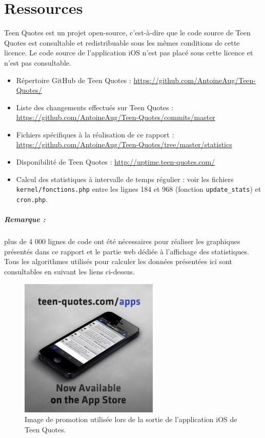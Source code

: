 \documentclass{report}
\begin{document}
	\chapter{Ressources}
	\label{chap:ressources}
	Teen Quotes est un projet open-source, c'est-à-dire que le code source de Teen Quotes est consultable et redistribuable sous les mêmes conditions de cette licence. Le code source de l'application iOS n'est pas placé sous cette licence et n'est pas consultable.\\

	\begin{itemize}
		\item Répertoire GitHub de Teen Quotes : \url{https://github.com/AntoineAug/Teen-Quotes/}
		\item Liste des changements effectués sur Teen Quotes : \url{https://github.com/AntoineAug/Teen-Quotes/commits/master}
		\item Fichiers spécifiques à la réalisation de ce rapport : \url{https://github.com/AntoineAug/Teen-Quotes/tree/master/statistics}
		\item Disponibilité de Teen Quotes : \url{http://uptime.teen-quotes.com/}
		\item Calcul des statistiques à intervalle de temps régulier : voir les fichiers \texttt{kernel/fonctions.php} entre les lignes 184 et 968 (fonction \texttt{update\_stats}) et \texttt{cron.php}.
	\end{itemize}

	\paragraph{Remarque :} plus de 4 000 lignes de code ont été nécessaires pour réaliser les graphiques présentés dans ce rapport et le partie web dédiée à l'affichage des statistiques. Tous les algorithmes utilisés pour calculer les données présentées ici sont consultables en suivant les liens ci-dessus.

	\begin{figure}[H]
		\center
		\includegraphics[width=250px]{images/promoApp.png}
		\caption{Image de promotion utilisée lors de la sortie de l'application iOS de Teen Quotes.}
	\end{figure}

\end{document}
